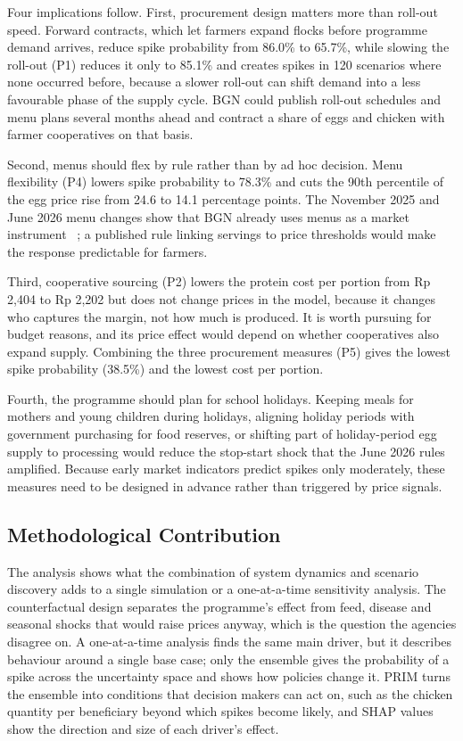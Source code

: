\documentclass[10pt,twocolumn,a4paper]{article}
\begin{document}
Four implications follow. First, procurement design matters more than roll-out speed. Forward contracts, which let farmers expand flocks before programme demand arrives, reduce spike probability from 86.0\% to 65.7\%, while slowing the roll-out (P1) reduces it only to 85.1\% and creates spikes in 120 scenarios where none occurred before, because a slower roll-out can shift demand into a less favourable phase of the supply cycle. BGN could publish roll-out schedules and menu plans several months ahead and contract a share of eggs and chicken with farmer cooperatives on that basis.


Second, menus should flex by rule rather than by ad hoc decision. Menu flexibility (P4) lowers spike probability to 78.3\% and cuts the 90th percentile of the egg price rise from 24.6 to 14.1 percentage points. The November 2025 and June 2026 menu changes show that BGN already uses menus as a market instrument ~\cite{prabowo2025,egg3x2026}; a published rule linking servings to price thresholds would make the response predictable for farmers.


Third, cooperative sourcing (P2) lowers the protein cost per portion from Rp 2,404 to Rp 2,202 but does not change prices in the model, because it changes who captures the margin, not how much is produced. It is worth pursuing for budget reasons, and its price effect would depend on whether cooperatives also expand supply. Combining the three procurement measures (P5) gives the lowest spike probability (38.5\%) and the lowest cost per portion.


Fourth, the programme should plan for school holidays. Keeping meals for mothers and young children during holidays, aligning holiday periods with government purchasing for food reserves, or shifting part of holiday-period egg supply to processing would reduce the stop-start shock that the June 2026 rules amplified. Because early market indicators predict spikes only moderately, these measures need to be designed in advance rather than triggered by price signals.


\subsection{Methodological Contribution}

The analysis shows what the combination of system dynamics and scenario discovery adds to a single simulation or a one-at-a-time sensitivity analysis. The counterfactual design separates the programme's effect from feed, disease and seasonal shocks that would raise prices anyway, which is the question the agencies disagree on. A one-at-a-time analysis finds the same main driver, but it describes behaviour around a single base case; only the ensemble gives the probability of a spike across the uncertainty space and shows how policies change it. PRIM turns the ensemble into conditions that decision makers can act on, such as the chicken quantity per beneficiary beyond which spikes become likely, and SHAP values show the direction and size of each driver's effect.
\end{document}
